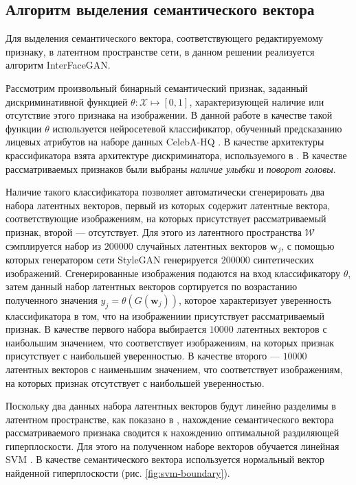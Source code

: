 

\subsection{Алгоритм выделения семантического вектора}

Для выделения семантического вектора, соответствующего редактируемому признаку, в латентном пространстве сети, в данном решении реализуется алгоритм InterFaceGAN.

Рассмотрим произвольный бинарный семантический признак, заданный дискриминативной функцией $\theta : \mathcal X \mapsto [0,1]$, характеризующей наличие или отсутствие этого признака на изображении. 
В данной работе в качестве такой функции $\theta$ используется нейросетевой классификатор, обученный предсказанию лицевых атрибутов на наборе данных CelebA-HQ \cite{liu2015celeba, progressive-growing-gan}.
В качестве архитектуры крассификатора взята архитектуре дискриминатора, используемого в \cite{progressive-growing-gan, StyleGAN}. 
В качестве рассматриваемых признаков были выбраны \emph{наличие улыбки} и \emph{поворот головы}.

Наличие такого классификатора позволяет автоматически сгенерировать два набора латентных векторов, первый из которых содержит латентные вектора, соответствующие изображениям, на которых присутствует рассматриваемый признак, второй --- отсутствует.
Для этого из латентного пространства $\mathcal W$ сэмплируется набор из $200000$ случайных латентных векторов $\mathbf w_j$, с помощью которых генератором сети StyleGAN генерируется $200000$ синтетических изображений.
Сгенерированные изображения подаются на вход классификатору $\theta$, затем данный набор латентных векторов сортируется по возрастанию полученного значения $ y_j = \theta(G(\mathbf w_j))$, которое характеризует уверенность классификатора в том, что на изображениии присутствует рассматриваемый признак.
В качестве первого набора выбирается $10000$ латентных векторов с наибольшим значением, что соответствует изображениям, на которых признак присутствует с наибольшей уверенностью.
В качестве второго --- $10000$ латентных векторов с наименьшим значением, что соответствует изображениям, на которых признак отсутствует с наибольшей уверенностью.

Поскольку два данных набора латентных векторов будут линейно разделимы в латентном пространстве, как показано в \cite{StyleGAN}, нахождение семантического вектора рассматриваемого признака сводится к нахождению оптимальной раздиляющей гиперплоскости. 
Для этого на полученном наборе векторов обучается линейная SVM \cite{svm}.
В качестве семантического вектора используется нормальный вектор найденной гиперплоскости (рис. \ref{fig:svm-boundary}).


